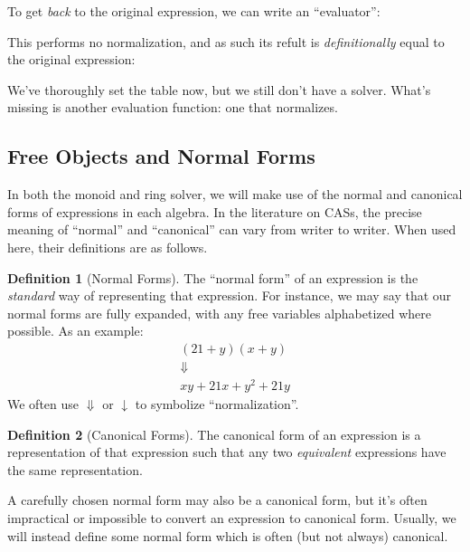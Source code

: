\documentclass[draft, twocolumn]{article}
\theoremstyle{definition}
\newtheorem{definition}{Definition}[section]
\theoremstyle{definition}
\begin{document}
To get \emph{back} to the original expression, we can write an ``evaluator'':

This performs no normalization, and as such its refult is \emph{definitionally}
equal to the original expression\footnotemark:

We've thoroughly set the table now, but we still don't have a solver. What's
missing is another evaluation function: one that normalizes.
\subsection{Free Objects and Normal Forms}
In both the monoid and ring solver, we will make use of the normal and canonical
forms of expressions in each algebra. In the literature on CASs, the precise
meaning of ``normal'' and ``canonical'' can vary from writer to writer. When
used here, their definitions are as follows.
\begin{definition}[Normal Forms]
  The ``normal form'' of an expression is the \emph{standard} way of
  representing that expression. For instance, we may say that our normal forms
  are fully expanded, with any free variables alphabetized where possible. As an
  example:
  \begin{equation}
  \begin{gathered}
    (21 + y)(x + y) \\
    \Downarrow \\
    xy + 21x + y^2 + 21y
  \end{gathered}
  \end{equation}
  We often use \(\Downarrow\) or \(\downarrow\) to symbolize ``normalization''.
\end{definition}
\begin{definition}[Canonical Forms]
  The canonical form of an expression is a representation of that expression such
  that any two \emph{equivalent} expressions have the same representation.
\end{definition}
A carefully chosen normal form may also be a canonical form, but it's often
impractical or impossible to convert an expression to canonical form. Usually,
we will instead define some normal form which is often (but not always)
canonical.
\end{document}
